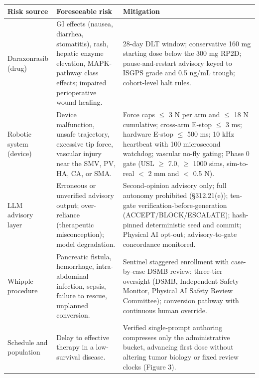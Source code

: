 \noindent\begin{tabularx}{\textwidth}{L{3.4cm} Y Y}
\toprule
\textbf{Risk source} & \textbf{Foreseeable risk} & \textbf{Mitigation} \\
\midrule
Daraxonrasib (drug) & GI effects (nausea, diarrhea, stomatitis), rash, hepatic enzyme elevation, MAPK-pathway class effects; impaired perioperative wound healing. & 28-day DLT window; conservative 160 mg starting dose below the 300 mg RP2D; pause-and-restart advisory keyed to ISGPS grade and 0.5 ng/mL trough; cohort-level halt rules. \\
\addlinespace
Robotic system (device) & Device malfunction, unsafe trajectory, excessive tip force, vascular injury near the SMV, PV, HA, CA, or SMA. & Force caps $\leq$ 3 N per arm and $\leq$ 18 N cumulative; cross-arm E-stop $\leq$ 3 ms; hardware E-stop $\leq$ 500 ms; 10 kHz heartbeat with 100 microsecond watchdog; vascular no-fly gating; Phase 0 gate (USL $\geq$ 7.0, $\geq$ 1000 sims, sim-to-real $<$ 2 mm and $<$ 0.5 N). \\
\addlinespace
LLM advisory layer & Erroneous or unverified advisory output; over-reliance (therapeutic misconception); model degradation. & Second-opinion advisory only; full autonomy prohibited (\S 312.21(e)); ten-gate verification-before-generation (ACCEPT/BLOCK/ESCALATE); hash-pinned deterministic seed and commit; Physical AI opt-out; advisory-to-gate concordance monitored. \\
\addlinespace
Whipple procedure & Pancreatic fistula, hemorrhage, intra-abdominal infection, sepsis, failure to rescue, unplanned conversion. & Sentinel staggered enrollment with case-by-case DSMB review; three-tier oversight (DSMB, Independent Safety Monitor, Physical AI Safety Review Committee); conversion pathway with continuous human override. \\
\addlinespace
Schedule and population & Delay to effective therapy in a low-survival disease. & Verified single-prompt authoring compresses only the administrative bucket, advancing first dose without altering tumor biology or fixed review clocks (Figure 3). \\
\bottomrule
\end{tabularx}

